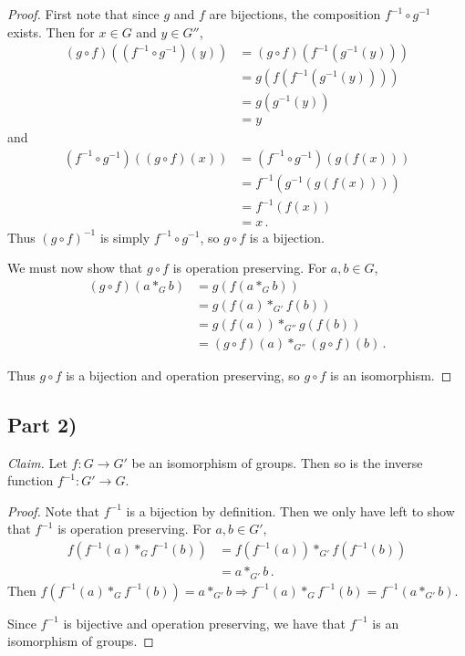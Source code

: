 \documentclass{abrice}
\newcommand{\Claim}{\emph{Claim.}\xspace}%
\begin{document}
\begin{proof}
  First note that since $g$ and $f$ are bijections, the composition $f^{-1}
  \circ g^{-1}$ exists. Then for $x \in G$ and $y \in G''$,
  \begin{align*}
    (g \circ f)((f^{-1} \circ g^{-1})(y))
    &= (g \circ f)(f^{-1}(g^{-1}(y))) \\
    &= g(f(f^{-1}(g^{-1}(y)))) \\
    &= g(g^{-1}(y)) \\
    &= y
  \end{align*}
  and
  \begin{align*}
    (f^{-1} \circ g^{-1})((g \circ f)(x))
    &= (f^{-1} \circ g^{-1})(g(f(x))) \\
    &= f^{-1}(g^{-1}(g(f(x)))) \\
    &= f^{-1}(f(x)) \\
    &= x\, .
  \end{align*}
  Thus ${(g \circ f)}^{-1}$ is simply $f^{-1} \circ g^{-1}$, so $g \circ f$ is a
  bijection.

  We must now show that $g \circ f$ is operation preserving. For $a,b \in G$,
  \begin{align*}
    (g \circ f) (a *_G b)
    &= g(f(a *_G b)) \\
    &= g(f(a) *_{G'} f(b)) \\
    &= g(f(a)) *_{G''} g(f(b)) \\
    &= (g \circ f)(a) *_{G''} (g \circ f)(b)\, .
  \end{align*}

  Thus $g \circ f$ is a bijection and operation preserving, so $g \circ f$ is an
  isomorphism.
\end{proof}

\subsection{Part 2)}

\Claim Let $f : G \to G'$ be an isomorphism of groups. Then so is the inverse
function $f^{-1} : G' \to G$.

\begin{proof}
  Note that $f^{-1}$ is a bijection by definition. Then we only have left to
  show that $f^{-1}$ is operation preserving. For $a,b \in G'$,
  \begin{align*}
    f(f^{-1}(a) *_{G} f^{-1}(b))
    &= f(f^{-1}(a)) *_{G'} f(f^{-1}(b)) \\
    &= a *_{G'} b\, .
  \end{align*}
  Then $f(f^{-1}(a) *_{G} f^{-1}(b)) = a *_{G'} b \Rightarrow f^{-1}(a)
  *_{G} f^{-1}(b) = f^{-1}(a *_{G'} b)$.

  Since $f^{-1}$ is bijective and operation preserving, we have that $f^{-1}$ is
  an isomorphism of groups.
\end{proof}
\end{document}

